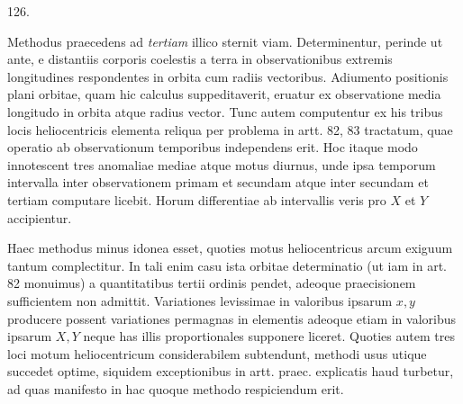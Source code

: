 \par{}\medskip
\begin{center}\hypertarget{native-173-article126}{}126.\end{center}
Methodus praecedens ad \emph{tertiam} illico sternit viam. Determinentur, perinde
ut ante, e distantiis corporis coelestis a terra in observationibus extremis
longitudines respondentes in orbita cum radiis vectoribus. Adiumento positionis
plani orbitae, quam hic calculus suppeditaverit, eruatur ex observatione
media longitudo in orbita atque radius vector. Tunc autem computentur ex
his tribus locis heliocentricis elementa reliqua per problema in artt. 82, 83
tractatum, quae operatio ab observationum temporibus independens erit. Hoc
itaque modo innotescent tres anomaliae mediae atque motus diurnus, unde
ipsa temporum intervalla inter observationem primam et secundam atque inter
secundam et tertiam computare licebit. Horum differentiae ab intervallis veris
pro $X$ et $Y$ accipientur.

Haec methodus minus idonea esset, quoties motus heliocentricus arcum
exiguum tantum complectitur. In tali enim casu ista orbitae determinatio (ut
iam in art. 82 monuimus) a quantitatibus tertii ordinis pendet, adeoque praecisionem
sufficientem non admittit. Variationes levissimae in valoribus ipsarum
$x,y$ producere possent variationes permagnas in elementis adeoque etiam
in valoribus ipsarum $X,Y$ neque has illis proportionales supponere liceret.
Quoties autem tres loci motum heliocentricum considerabilem subtendunt, methodi
usus utique succedet optime, siquidem exceptionibus in artt. praec. explicatis
haud turbetur, ad quas manifesto in hac quoque methodo respiciendum
erit.
